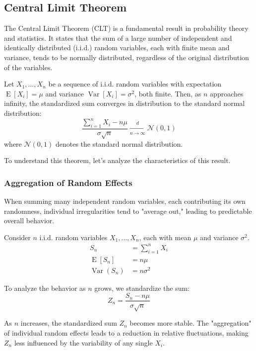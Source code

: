 \documentclass[10pt, headings=standardclasses, parskip=half, twoside]{scrartcl}
\begin{document}
\subsection{Central Limit Theorem}

The Central Limit Theorem (CLT) is a fundamental result in probability theory and statistics. It states that the sum of a large number of independent and identically distributed (i.i.d.) random variables, each with finite mean and variance, tends to be normally distributed, regardless of the original distribution of the variables.

\begin{theorem}{}
    \label{thm:clt}
    Let $X_{1}, \ldots, X_{n}$ be a sequence of i.i.d. random variables with expectation $\operatorname{E}[X_{i}]=\mu$ and variance $\operatorname{Var}[X_{i}]=\sigma^{2}$, both finite.
    Then, as $n$ approaches infinity, the standardized sum converges in distribution to the standard normal distribution:
    \[
    \frac{\sum_{i=1}^{n} X_{i}-n \mu}{\sigma \sqrt{n}} \xrightarrow[n \rightarrow \infty]{d} \mathcal{N}(0,1)
    \]
    where $\mathcal{N}(0,1)$ denotes the standard normal distribution.
\end{theorem}


To understand this theorem, let's analyze the characteristics of this result.

\subsubsection{Aggregation of Random Effects}
When summing many independent random variables, each contributing its own randomness, individual irregularities tend to "average out," leading to predictable overall behavior.

Consider $n$ i.i.d. random variables $X_{1}, \ldots, X_{n}$, each with mean $\mu$ and variance $\sigma^{2}$.
\[
\begin{aligned}
S_{n} &= {\textstyle \sum_{i=1}^{n}} X_{i} \\ %
\operatorname{E}[S_{n}] &=n \mu \\
\operatorname{Var}(S_{n}) &=n \sigma^{2}
\end{aligned}
\]

To analyze the behavior as $n$ grows, we standardize the sum:
\[
Z_{n}=\frac{S_{n}-n \mu}{\sigma \sqrt{n}}
\]

As $n$ increases, the standardized sum $Z_{n}$ becomes more stable. The "aggregation" of individual random effects leads to a reduction in relative fluctuations, making $Z_{n}$ less influenced by the variability of any single $X_{i}$.
\end{document}
